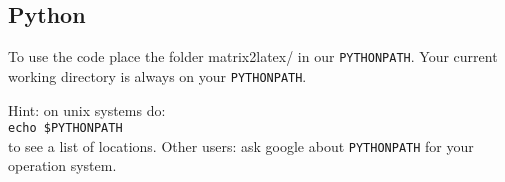 \subsection{Python}
To use the code place the folder matrix2latex/ in our \verb!PYTHONPATH!.
Your current working directory is always on your \verb!PYTHONPATH!.

Hint: on unix systems do: \\
\verb!echo $PYTHONPATH! \\
to see a list of locations. Other users: ask google about \verb!PYTHONPATH!
for your operation system.
